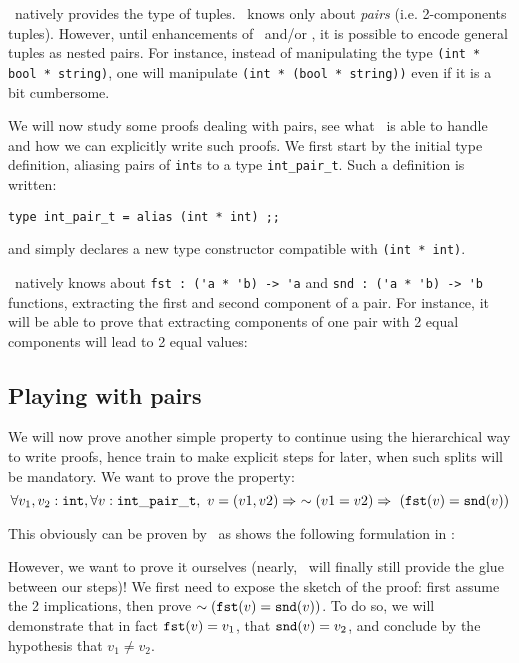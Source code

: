 \documentclass[11pt,a4paper,twoside,onecolumn,fullpage]{article}
\begin{document}
\focal\ natively provides the type of tuples. \zenon\ knows only about
{\em pairs} (i.e. 2-components tuples). However, until enhancements of
\focal\ and/or \zenon, it is possible to encode general tuples as
nested pairs. For instance, instead of manipulating the type
\lstinline"(int * bool * string)", one will manipulate
\lstinline"(int * (bool * string))" even if it is a bit cumbersome.

\medskip
We will now study some proofs dealing with pairs, see what \zenon\ is
able to handle and how we can explicitly write such proofs. We first
start by the initial type definition, aliasing pairs of
\lstinline"int"s to a type \lstinline"int_pair_t". Such a definition
is written:

{\scriptsize
\begin{lstlisting}
type int_pair_t = alias (int * int) ;;
\end{lstlisting}}

\noindent and simply declares a new type constructor compatible with
\lstinline "(int * int)".

\zenon\ natively knows about \lstinline"fst : ('a * 'b) -> 'a" and
\lstinline"snd : ('a * 'b) -> 'b" functions, extracting the first and
second component of a pair. For instance, it will be able to prove
that extracting components of one pair with 2 equal components will lead
to 2 equal values:

{\scriptsize
}



\subsection{Playing with pairs}

We will now prove another simple property to continue using the hierarchical way
to write proofs, hence train to make explicit steps for later, when
such splits will be mandatory. We want to prove the property:
$$
\forall v_1, v_2 : {\tt int}, \forall v : {\tt int\_pair\_t},
\ v = (v1, v2) \Rightarrow\ \sim (v1 = v2) \Rightarrow ~ ({\tt fst} (v) = {\tt snd} (v))
$$

This obviously can be proven by \zenon\ as shows the following
formulation in \focal:

{\scriptsize
}

However, we want to prove it ourselves (nearly, \zenon\ will finally still
provide the glue between our steps)! We first need to expose
the sketch of the proof: first assume the 2 implications, then prove
$\sim ({\tt fst} (v) = {\tt snd} (v))$. To do so, we will demonstrate that in fact
${\tt fst} (v) = v_1$, that ${\tt snd} (v) = v_2$, and conclude by the hypothesis
that $v_1 \not = v_2$.
\end{document}
